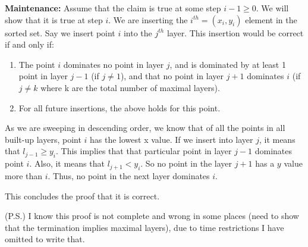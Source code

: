 \documentclass[a4paper]{article}
\begin{document}
\textbf{Maintenance:} Assume that the claim is true at some step $i-1 \geq 0$. We will show that it is true at step $i$. We are inserting the $i^{th} = (x_i, y_i)$ element in the sorted set. Say we insert point $i$ into the $j^{th}$ layer. This insertion would be correct if and only if:
\begin{enumerate}
    \item The point $i$ dominates no point in layer $j$, and is dominated by at least 1 point in layer $j-1$ (if $j \neq 1$), and that no point in layer $j + 1$ dominates $i$ (if $j \neq k$ where k are the total number of maximal layers).
    \item For all future insertions, the above holds for this point.
\end{enumerate}

As we are sweeping in descending order, we know that of all the points in all built-up layers, point $i$ has the lowest x value. If we insert into layer $j$, it means that $l_{j-1} \geq y_i$. This implies that that particular point in layer $j-1$ dominates point $i$. Also, it means that $l_{j+1} < y_i$. So no point in the layer $j+1$ has a $y$ value more than $i$. Thus, no point in the next layer dominates $i$.

This concludes the proof that it is correct.

\vspace{1in}

(P.S.) I know this proof is not complete and wrong in some places (need to show that the termination implies maximal layers), due to time restrictions I have omitted to write that.
\end{document}
